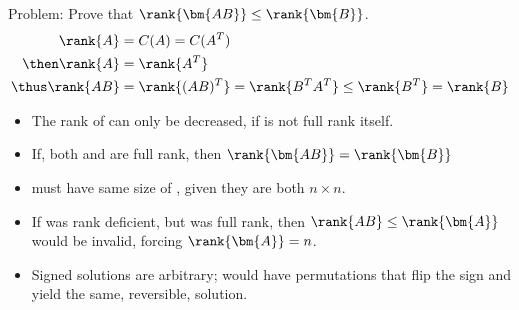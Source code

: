 \begin{itemize}
\begin{enumerate}
{    Problem: Prove that \(\rank{\bm{AB}} \leq \rank{ \bm{B} }\).
    }
    \begin{align*}
      \rank{A} &= C(A) = C(A^T)\\
      \then \rank{A} &= \rank{A^T} \\
      \thus \rank{AB} &= \rank{(AB)^T} = \rank{B^TA^T} \leq \rank{B^T} = \rank{B}
    \end{align*}
    \begin{itemize}
      \item The rank of  can only be decreased, if  is not full
        rank itself.
      \item If, both  and  are full rank, then
        \(\rank{\bm{AB}} = \rank{\bm{B}}\)
    \end{itemize}

    \begin{itemize}
      \item {} must have same size of , given they are both \(n
        \times n\).
      \item If  was rank deficient, but  was full rank, then
      \(\rank{AB} \leq \rank{\bm{A}}\) would be invalid, forcing
      \(\rank{\bm{A}} = n\).
    \end{itemize}

    \begin{itemize}
      \item Signed solutions are arbitrary;  would have permutations that
        flip the sign and yield the same, reversible, solution.
    \end{itemize}
  \end{enumerate}
\end{itemize}

